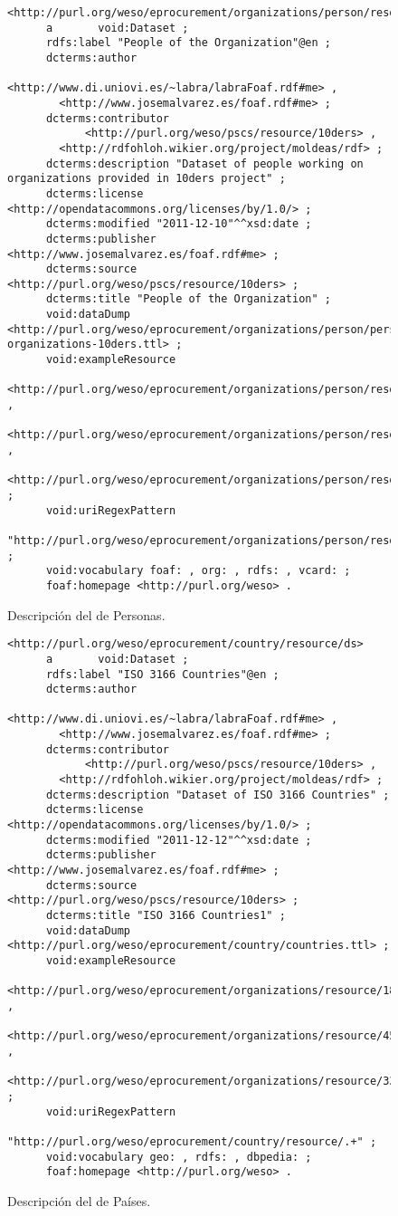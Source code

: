 \begin{figure}[!htp]
\begin{lstlisting} 
<http://purl.org/weso/eprocurement/organizations/person/resource/ds>
      a       void:Dataset ;
      rdfs:label "People of the Organization"@en ;
      dcterms:author 
            <http://www.di.uniovi.es/~labra/labraFoaf.rdf#me> , 
	    <http://www.josemalvarez.es/foaf.rdf#me> ;
      dcterms:contributor
            <http://purl.org/weso/pscs/resource/10ders> ,
	    <http://rdfohloh.wikier.org/project/moldeas/rdf> ;
      dcterms:description "Dataset of people working on organizations provided in 10ders project" ;
      dcterms:license <http://opendatacommons.org/licenses/by/1.0/> ;
      dcterms:modified "2011-12-10"^^xsd:date ;
      dcterms:publisher <http://www.josemalvarez.es/foaf.rdf#me> ;
      dcterms:source <http://purl.org/weso/pscs/resource/10ders> ;
      dcterms:title "People of the Organization" ;
      void:dataDump <http://purl.org/weso/eprocurement/organizations/person/person-organizations-10ders.ttl> ;
      void:exampleResource
        <http://purl.org/weso/eprocurement/organizations/person/resource/1> , 
	<http://purl.org/weso/eprocurement/organizations/person/resource/2> , 
	<http://purl.org/weso/eprocurement/organizations/person/resource/3> ;
      void:uriRegexPattern
        "http://purl.org/weso/eprocurement/organizations/person/resource/.+" ;
      void:vocabulary foaf: , org: , rdfs: , vcard: ;
      foaf:homepage <http://purl.org/weso> .
\end{lstlisting}
	\caption{Descripción del \dataset de Personas.}
	\label{fig:people-ds}
\end{figure}


\begin{figure}[!htp]
\begin{lstlisting} 
<http://purl.org/weso/eprocurement/country/resource/ds>
      a       void:Dataset ;
      rdfs:label "ISO 3166 Countries"@en ;
      dcterms:author 
            <http://www.di.uniovi.es/~labra/labraFoaf.rdf#me> , 
	    <http://www.josemalvarez.es/foaf.rdf#me> ;
      dcterms:contributor
            <http://purl.org/weso/pscs/resource/10ders> ,
	    <http://rdfohloh.wikier.org/project/moldeas/rdf> ;
      dcterms:description "Dataset of ISO 3166 Countries" ;
      dcterms:license <http://opendatacommons.org/licenses/by/1.0/> ;
      dcterms:modified "2011-12-12"^^xsd:date ;
      dcterms:publisher <http://www.josemalvarez.es/foaf.rdf#me> ;
      dcterms:source <http://purl.org/weso/pscs/resource/10ders> ;
      dcterms:title "ISO 3166 Countries1" ;
      void:dataDump <http://purl.org/weso/eprocurement/country/countries.ttl> ;
      void:exampleResource
        <http://purl.org/weso/eprocurement/organizations/resource/18000000> , 
	<http://purl.org/weso/eprocurement/organizations/resource/45000000> , 
	<http://purl.org/weso/eprocurement/organizations/resource/33000000> ;
      void:uriRegexPattern
        "http://purl.org/weso/eprocurement/country/resource/.+" ;
      void:vocabulary geo: , rdfs: , dbpedia: ;
      foaf:homepage <http://purl.org/weso> .
\end{lstlisting}
	\caption{Descripción del \dataset de Países.}
	\label{fig:countries-ds}
\end{figure}

